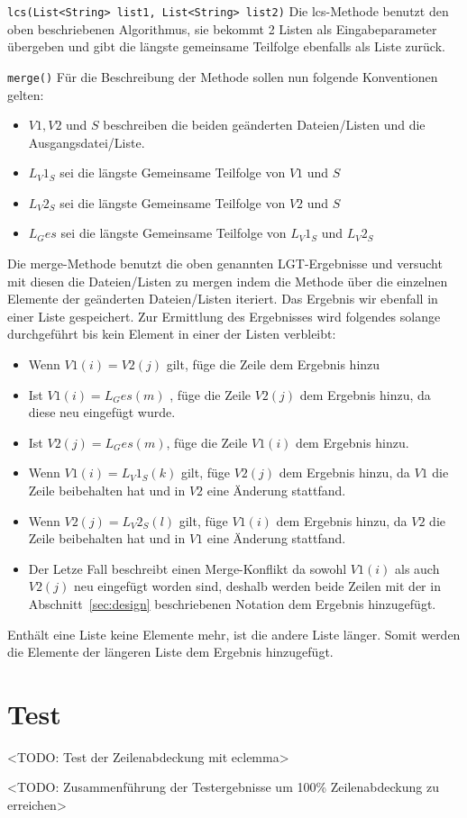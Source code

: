 \documentclass[a4paper,titlepage,12pt]{scrartcl}
\begin{document}
\texttt{lcs(List<String> list1, List<String> list2)}
Die lcs-Methode benutzt den oben beschriebenen Algorithmus, sie bekommt 2 Listen als Eingabeparameter übergeben und gibt die längste gemeinsame Teilfolge ebenfalls als Liste zurück.


\texttt{merge()}
Für die Beschreibung der Methode sollen nun folgende Konventionen gelten:
\begin{itemize}
\item $V1 , V2$ und $S$ beschreiben die beiden geänderten Dateien/Listen und die Ausgangsdatei/Liste.
\item $L_V1_S$ sei die längste Gemeinsame Teilfolge von $V1$ und $S$
\item $L_V2_S$ sei die längste Gemeinsame Teilfolge von $V2$ und $S$
\item $L_Ges$ sei die längste Gemeinsame Teilfolge von $L_V1_S$ und $L_V2_S$
\end{itemize}

Die merge-Methode benutzt die oben genannten LGT-Ergebnisse und versucht mit diesen die Dateien/Listen zu mergen indem die Methode über die einzelnen Elemente der geänderten Dateien/Listen iteriert.
Das Ergebnis wir ebenfall in einer Liste gespeichert.
Zur Ermittlung des Ergebnisses wird folgendes solange durchgeführt bis kein Element in einer der Listen verbleibt:
\begin{itemize}
\item Wenn $V1(i) = V2(j)$ gilt, füge die Zeile dem Ergebnis hinzu
\item Ist $V1(i) = L_Ges(m)$ , füge die Zeile $V2(j)$ dem Ergebnis hinzu, da diese neu eingefügt wurde.
\item Ist $V2(j) = L_Ges(m)$, füge die Zeile $V1(i)$ dem Ergebnis hinzu.
\item Wenn $V1(i) = L_V1_S(k)$ gilt, füge $V2(j)$ dem Ergebnis hinzu, da $V1$ die Zeile beibehalten hat und in $V2$ eine Änderung stattfand.
\item Wenn $V2(j) = L_V2_S(l)$ gilt, füge $V1(i)$ dem Ergebnis hinzu, da $V2$ die Zeile beibehalten hat und in $V1$ eine Änderung stattfand.
\item Der Letze Fall beschreibt einen Merge-Konflikt da sowohl $V1(i)$ als auch $V2(j)$ neu eingefügt worden sind, deshalb werden beide Zeilen mit der in Abschnitt~\ref{sec:design} beschriebenen Notation dem Ergebnis hinzugefügt.
\end{itemize}
Enthält eine Liste keine Elemente mehr, ist die andere Liste länger. Somit werden die Elemente der längeren Liste dem Ergebnis hinzugefügt.



\section{Test}
\label{sec:test}
<TODO: Test der Zeilenabdeckung mit eclemma>

<TODO: Zusammenführung der Testergebnisse um 100\% Zeilenabdeckung zu erreichen>


\clearpage
\appendix



\end{document}
